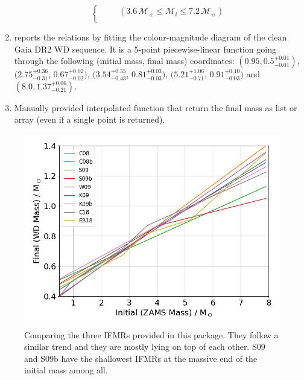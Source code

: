 \documentclass[fleqn,usenatbib]{rasti}
\newcommand{\msun}{\mathcal{M}_{\sun}}
\begin{document}
\begin{enumerate}
\begin{equation}
\begin{cases}
                  \qquad(3.6\,\msun \leq \mathcal{M}_i \leq 7.2\,\msun)\\
              \end{cases}
    \end{equation}
    \item \citet{2018ApJ...860L..17E} reports the relations by fitting the colour-magnitude diagram of the clean Gaia DR2 WD sequence. It is a 5-point piecewise-linear function going through the following (initial mass, final mass) coordinates: $(0.95, 0.5^{+0.01}_{-0.01})$, $(2.75^{+0.36}_{-0.31}$, $0.67^{+0.02}_{-0.02})$, $(3.54^{+0.55}_{-0.43}$, $0.81^{+0.03}_{-0.03})$, $(5.21^{+1.06}_{-0.71}$, $0.91^{+0.10}_{-0.03})$ and $(8.0, 1.37^{+0.06}_{-0.21})$.
    \item Manually provided interpolated function that return the final mass as list or array (even if a single point is returned).
\end{enumerate}

\begin{figure}
    \centering
    \includegraphics[width=\columnwidth]{ifmrs.png}
    \caption{Comparing the three IFMRs provided in this package. They follow
    a similar trend and they are mostly lying on top of each other. S09 and S09b
    have the shallowest IFMRs at the massive end of the initial mass among all.}
    \label{fig:ifmrs}
\end{figure}
\end{document}
